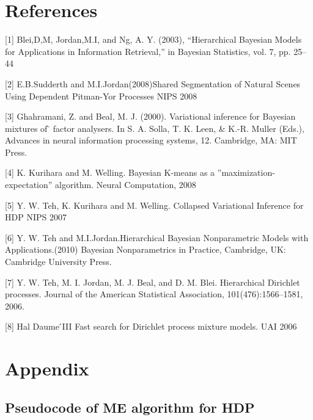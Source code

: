 \documentclass{article}
\begin{document}
\section{References}
\small{
[1]  Blei,D,M, Jordan,M.I, and Ng, A. Y. (2003), “Hierarchical Bayesian Models for Applications 
  in Information Retrieval,” in Bayesian Statistics, vol. 7, pp. 25–44 

[2] E.B.Sudderth and M.I.Jordan(2008)Shared Segmentation of Natural Scenes Using Dependent Pitman-Yor Processes NIPS 2008


[3] Ghahramani, Z. and Beal, M. J. (2000). Variational inference for Bayesian mixtures of                                                          ̈
  factor analysers. In S. A. Solla, T. K. Leen, \& K.-R. Muller (Eds.), Advances in neural
  information processing systems, 12. Cambridge, MA: MIT Press.

[4] K. Kurihara and M. Welling. Bayesian K-means as a
 ”maximization-expectation” algorithm. Neural Computation, 2008

[5] Y. W. Teh, K. Kurihara and M. Welling. Collapsed Variational Inference for HDP
NIPS 2007

[6] Y. W. Teh and M.I.Jordan.Hierarchical Bayesian Nonparametric Models with Applications.(2010) Bayesian 
Nonparametrics in Practice, Cambridge, UK: Cambridge University Press.

[7] Y. W. Teh, M. I. Jordan, M. J. Beal, and D. M. Blei. Hierarchical Dirichlet processes. Journal of the 
American Statistical Association, 101(476):1566–1581, 2006.

[8] Hal Daume ́III Fast search for Dirichlet process mixture models. UAI 2006
}
\section{Appendix}
\subsection{Pseudocode of ME algorithm for HDP}
\end{document}
